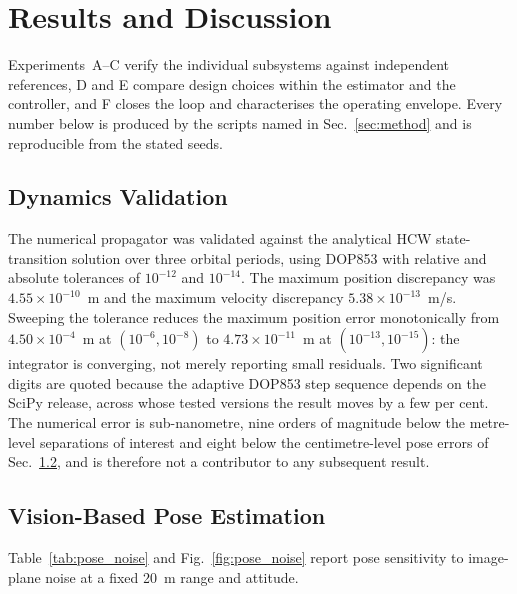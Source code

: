 \section{Results and Discussion}
\label{sec:results}

Experiments~A--C verify the individual subsystems against independent
references, D and E compare design choices within the estimator and the
controller, and F closes the loop and characterises the operating envelope.
Every number below is produced by the scripts named in Sec.~\ref{sec:method}
and is reproducible from the stated seeds.

\subsection{Dynamics Validation}
\label{sec:res_dynamics}

The numerical propagator was validated against the analytical HCW
state-transition solution over three orbital periods, using DOP853 with
relative and absolute tolerances of $10^{-12}$ and $10^{-14}$. The maximum
position discrepancy was $4.55\times10^{-10}$~m and the maximum velocity
discrepancy $5.38\times10^{-13}$~m/s.
Sweeping the tolerance reduces the maximum position error monotonically from
$4.50\times10^{-4}$~m at $(10^{-6},10^{-8})$ to $4.73\times10^{-11}$~m at
$(10^{-13},10^{-15})$: the integrator is converging, not merely reporting
small residuals. Two significant digits are quoted because the adaptive DOP853 step sequence
depends on the SciPy release, across whose tested versions the result moves by
a few per cent. The numerical error is sub-nanometre, nine orders of magnitude below the
metre-level separations of interest and eight below the centimetre-level pose
errors of Sec.~\ref{sec:res_pose}, and is therefore not a contributor to any
subsequent result.


\subsection{Vision-Based Pose Estimation}
\label{sec:res_pose}

Table~\ref{tab:pose_noise} and Fig.~\ref{fig:pose_noise} report pose
sensitivity to image-plane noise at a fixed 20~m range and attitude.

